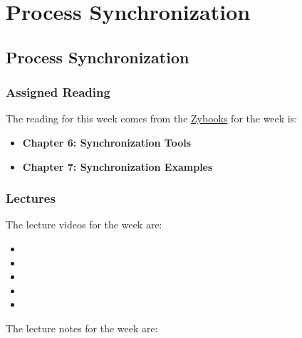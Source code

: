 \clearpage

\renewcommand{\ChapTitle}{Process Synchronization}
\renewcommand{\SectionTitle}{Process Synchronization}

\chapter{\ChapTitle}
\section{\SectionTitle}

\subsection{Assigned Reading}

The reading for this week comes from the \href{https://learn.zybooks.com/zybook/COLORADOCSPB3753KnoxFall2024}{Zybooks} for the week is:

\begin{itemize}
    \item \textbf{Chapter 6: Synchronization Tools}
    \item \textbf{Chapter 7: Synchronization Examples}
\end{itemize}

\subsection{Lectures}

The lecture videos for the week are:

\begin{itemize}
    \item {}
    \item {}
    \item {}
    \item {}
    \item {}
\end{itemize}

\noindent The lecture notes for the week are:

